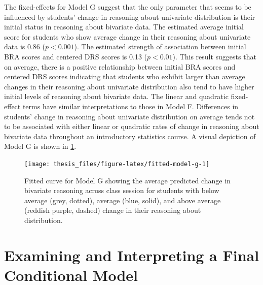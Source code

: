 \documentclass[11pt]{umnthesis}
\begin{document}
The fixed-effects for Model G suggest that the only parameter that seems to be influenced by students' change in reasoning about univariate distribution is their initial status in reasoning about bivariate data. The estimated average initial score for students who show average change in their reasoning about univariate data is 0.86 (\(p<0.001\)). The estimated strength of association between initial BRA scores and centered DRS scores is 0.13 (\(p<0.01\)). This result suggests that on average, there is a positive relationship between initial BRA scores and centered DRS scores indicating that students who exhibit larger than average changes in their reasoning about univariate distribution also tend to have higher initial levels of reasoning about bivariate data. The linear and quadratic fixed-effect terms have similar interpretations to those in Model F. Differences in students' change in reasoning about univariate distribution on average tends not to be associated with either linear or quadratic rates of change in reasoning about bivariate data throughout an introductory statistics course. A visual depiction of Model G is shown in \ref{fig:fitted-model-g}.

\begin{figure}[H]

{\centering \texttt{[image: thesis\_files/figure-latex/fitted-model-g-1]} 

}

\caption[Fitted curve for Model G showing the average predicted change in bivariate reasoning across class session for students with below average (grey, dotted), average (blue, solid), and above average (reddish purple, dashed) change in their reasoning about distribution]{Fitted curve for Model G showing the average predicted change in bivariate reasoning across class session for students with below average (grey, dotted), average (blue, solid), and above average (reddish purple, dashed) change in their reasoning about distribution.}\label{fig:fitted-model-g}
\end{figure}

\hypertarget{examining-and-interpreting-a-final-conditional-model}{%
\section{Examining and Interpreting a Final Conditional Model}\label{examining-and-interpreting-a-final-conditional-model}}
\end{document}
